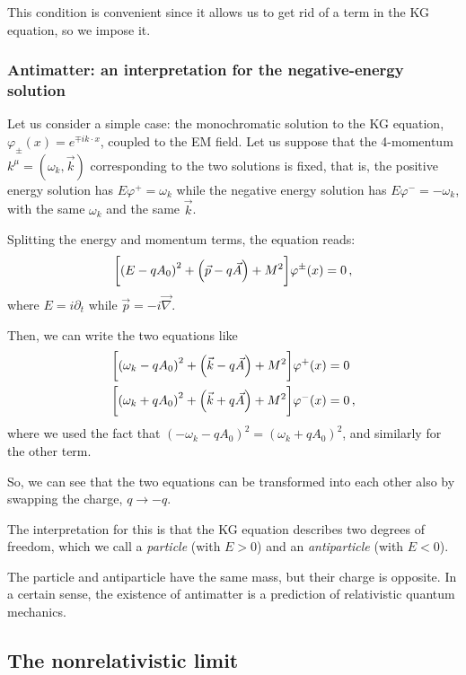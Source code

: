 \documentclass[main.tex]{subfiles}
\begin{document}
This condition is convenient since it allows us to get rid of a term in the KG equation, so we impose it. 

\subsubsection{Antimatter: an interpretation for the negative-energy solution}

Let us consider a simple case: the monochromatic solution to the KG equation, \(\varphi_{\pm} (x) = e^{\mp i k \cdot x}\), coupled to the EM field.
Let us suppose that the 4-momentum \(k^{\mu} = (\omega_{k}, \vec{k})\) corresponding to the two solutions is fixed, that is, the positive energy solution has \(E \varphi^{+} = \omega_{k}\) while the negative energy solution has \(E \varphi^{-} = - \omega_{k}\), with the same \(\omega_{k}\) and the same \(\vec{k}\). 

Splitting the energy and momentum terms, the equation reads: 
%
\begin{align}
\qty[\qty(E - q A_0 )^2 + \qty(\vec{p} - q \vec{A}) + M^2] \varphi^{\pm}(x) = 0
\,,
\end{align}
%
where \(E = i \partial_{t} \) while \(\vec{p} = - i \vec{\nabla}\). 

Then, we can write the two equations like 
%
\begin{align}
\qty[\qty(\omega_{k} - q A_0 )^2 + \qty(\vec{k} - q \vec{A}) + M^2] \varphi^{+}(x) &= 0 \\
\qty[\qty(\omega_{k} + q A_0 )^2 + \qty(\vec{k} + q \vec{A}) + M^2] \varphi^{-}(x) &= 0 
\,,
\end{align}
%
where we used the fact that \((-\omega_{k} - q A_0 )^2 = (\omega_{k} + q A_0 )^2\), and similarly for the other term.  

So, we can see that the two equations can be transformed into each other also by swapping the charge, \(q \rightarrow -q\). 

The interpretation for this is that the KG equation describes two degrees of freedom, which we call a \emph{particle} (with \(E>0\)) and an \emph{antiparticle} (with \(E<0\)).

The particle and antiparticle have the same mass, but their charge is opposite. 
In a certain sense, the existence of antimatter is a prediction of relativistic quantum mechanics. 

\subsection{The nonrelativistic limit}
\end{document}
